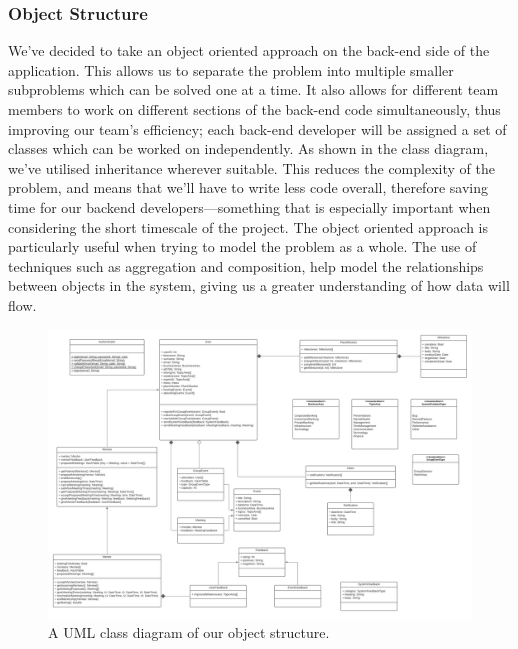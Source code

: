 \documentclass[10pt]{article}
\begin{document}
\subsubsection{Object Structure}
We've decided to take an object oriented approach on the back-end side of the
application. This allows us to separate the problem into multiple smaller
subproblems which can be solved one at a time. It also allows for different team
members to work on different sections of the back-end code simultaneously, thus
improving our team's efficiency; each back-end developer will be assigned a set
of classes which can be worked on independently. As shown in the class diagram,
we've utilised inheritance wherever suitable. This reduces the complexity of the
problem, and means that we'll have to write less code overall, therefore saving
time for our backend developers—something that is especially important when
considering the short timescale of the project. The object oriented approach is
particularly useful when trying to model the problem as a whole. The use of
techniques such as aggregation and composition, help model the relationships
between objects in the system, giving us a greater understanding of how data
will flow.

\begin{figure}[H]
    \centering
    \includegraphics[width=1\textwidth]{Objects}
    \caption{A UML class diagram of our object structure.}
    \label{fig:uml_class_diagram}
\end{figure}
\end{document}
